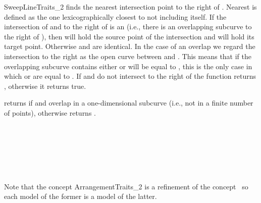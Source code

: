 \begin{ccRefConcept}{SweepLineTraits_2}
{finds the
nearest intersection point to the right of . Nearest is defined as the
one lexicographically closest to  not including  itself.
If the intersection of  and  to the
right of  is an  (i.e., there is an overlapping subcurve
to the right of ),
then  will hold the source point of the intersection and
 will hold its target point. Otherwise  and  are
identical. In the case of an overlap we regard the intersection
to the right as the open curve between  and . This means that
if the overlapping subcurve contains  either  or  will
be equal to , this is the only case in which  or  are
 equal to .
If  and  do not intersect to the right of 
the function returns , otherwise it returns true.
}


{returns  if  and  overlap
in a one-dimensional subcurve (i.e., not in a finite number
of points), otherwise returns
.}

\ccHasModels
  \\
  \\
  \\
   \\
   \\

  Note that the concept ArrangementTraits\_2 is a refinement of the 
  concept \ccRefName\ so each model of the former is a model of the latter.

\ccSeeAlso

 \\
 \\
 \\
 \\


\end{ccRefConcept}
